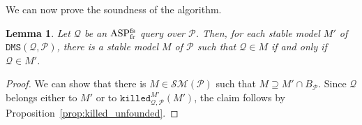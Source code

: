 \documentclass{tlp}
\newcommand{\nop}[1]{}
\newcommand{\Or}{\ensuremath{\mathtt{\,v\,}}\xspace}
\newcommand{\derives}{\ensuremath{\mathtt{\ :\!\!-}\ }}
\newcommand{\p}{\ensuremath{{\mathcal{P}}}}
\newcommand{\GP}{\ensuremath{Ground(\p)}}
\newcommand{\BP}{\ensuremath{B_{\p}}}
\newcommand{\R}{\ensuremath{r}}
\newcommand{\naf}{\ensuremath{\mathtt{not}}\xspace}
\newcommand{\ground}[1]{\ensuremath{Ground(#1)}}
\newcommand{\head}[1]{\ensuremath{H(#1)}}
\newcommand{\posbody}[1]{\ensuremath{B^+(#1)}}
\newcommand{\negbody}[1]{\ensuremath{B^-(#1)}}
\newenvironment{dlvcode}
  {\begin{displaymath}\begin{array}{l}}
  {\end{array}\end{displaymath}}
\newtheorem{lemma}[theorem]{Lemma}
\newcommand{\Q}{\mathcal{Q}}
\newcommand{\SM}{\mathcal{SM}}
\newcommand{\dmsqp}{\ensuremath{\DMS(\Q,\p)}}
\newcommand{\killed}[4]{\ensuremath{\mathtt{killed}^{#1}_{#3,#4}(#2)}}
\newcommand{\killedmpmp}{\ensuremath{\killed{M'}{M'}{\Q}{\p}}}
\newcommand{\DMS}{\ensuremath{\mathtt{DMS}}}
\renewcommand{\t}{\bar t}
\newcommand{\s}{\bar s}
\newcommand{\ASPFNFR}{\ensuremath{\rm ASP^{\rm fs}_{\rm fr}}}
\begin{document}
We can now prove the soundness of the algorithm.

\nop{
\begin{lemma}
\label{lem:one_minimal_model} 
Let $\Q$ be a query for a stratified program $\p$. Then,
for each stable model $M'$ of $\dmsqp$, there is a stable model $M$ of $\p$ such
that $M \supseteq M' \cap \BP$.
\end{lemma}
\begin{proof}
Let $M'$ be a stable model of $\dmsqp$.
Consider the program $\p \cup \Mpp$ and note that $\killedmpmp$ is an unfounded set for it.
Let $M$ be a stable model for $\p \cup \Mpp$ and suppose, by contradiction,
there is a model $N \subset M$ of $\ground{\p}^M$.
We want to show that $N' = M' \setminus (M \setminus N)$ is a model of 
$\ground{\dmsqp}^{M'}$.
To this end, consider a modified rule $\R_g' \in \ground{\dmsqp}$ such that
$\posbody{\R_g'} \subseteq N'$ and $\negbody{\R_g'} \cap M' = \emptyset$:
\begin{dlvcode}
\R_g': \ \tt p_1(\t_1)\,\Or\,\cdots\,\Or\,p_n(\t_n) \derives 
     magic\_p_1(\t_1),\,\ldots,\,magic\_p_n(\t_n),\\
\phantom{\R_g': \ \tt p_1(\t_1)\,\Or\,\cdots\,\Or\,p_n(\t_n) \derives }
     \tt q_1(\s_1),\,\ldots,\,q_j(\s_j),\,\naf~q_{j+1}(\s_{j+1}),\,\ldots,\,\naf~q_m(\s_m).
\end{dlvcode}Thus, by Lemma~\ref{lem:mappingGroundNonground},
\begin{dlvcode}
\R_g: \ \tt p_1(\t_1)\,\Or\,\cdots\,\Or\,p_n(\t_n) \derives 
    q_1(\s_1),\,\ldots,\,q_j(\s_j),\,\naf~q_{j+1}(\s_{j+1}),\,\ldots,\,\naf~q_m(\s_m).
\end{dlvcode}belongs to $\GP$.
Note that each atom in $\head{\R_g'} \cup \negbody{\R_g'}$ which is false
w.r.t.\ $M'$ belongs to $\killedmpmp$. Thus, we have $\negbody{\R_g} \cap M = \emptyset$
and $\posbody{\R_g} \subseteq N$.
Moreover, $\head{\R_g} \cap N = \head{\R_g'} \cap N' \neq \emptyset$.
\end{proof}
}

\begin{lemma}
\label{lem:extending_minimal_models} Let $\Q$ be an \ASPFNFR{} query over $\p$. Then, for each stable
model $M'$ of $\dmsqp$, there is a stable model $M$ of $\p$ such that 
$\Q \in M$ if and only if $\Q \in M'$.
\end{lemma}
\begin{proof}
We can show that there is $M \in \SM(\p)$ 
such that $M\supseteq M' \cap \BP$.
Since $\Q$ belongs either to $M'$ or to $\killedmpmp$, 
the claim follows by Proposition~\ref{prop:killed_unfounded}.
\end{proof}
\end{document}
